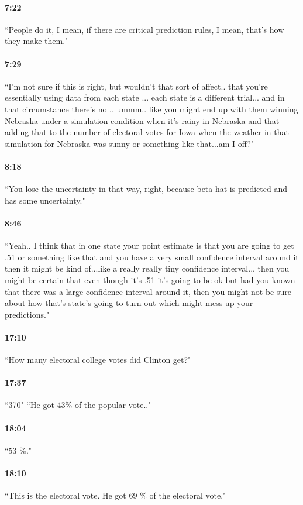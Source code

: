 \documentclass[11pt]{article}
\begin{document}
\paragraph{7:22} ``People do it, I mean, if there are critical prediction rules, I mean, that's how they make them."
\paragraph{7:29} ``I'm not sure if this is right, but wouldn't that sort of affect.. that you're essentially using data from each state ... each state is a different trial... and in that circumstance there's no .. ummm.. like you might end up with them winning Nebraska under a simulation condition when it's rainy in Nebraska and that adding that to the number of electoral votes for Iowa when the weather in that simulation for Nebraska was sunny or something like that...am I off?"
\paragraph{8:18} ``You lose the uncertainty in that way, right, because beta hat is predicted and has some uncertainty."  
\paragraph{8:46} ``Yeah.. I think that in one state your point estimate is that you are going to get .51 or something like that and you have a very small confidence interval around it then it might be kind of...like a really really tiny confidence interval... then you might be certain that even though it's .51 it's going to be ok but had you known that there was a large confidence interval around it, then you might not be sure about how that's state's going to turn out which might mess up your predictions."
\paragraph{17:10} ``How many electoral college votes did Clinton get?" 
\paragraph{17:37} ``370" ``He got 43\% of the popular vote.."
\paragraph{18:04} ``53 \%."
\paragraph{18:10} ``This is the electoral vote.  He got 69 \% of the electoral vote."
\end{document}
